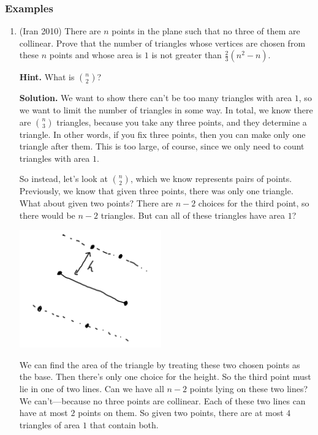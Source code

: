 \documentclass[11pt,paper=letter]{scrartcl}
\begin{document}
\subsubsection*{Examples}

\begin{enumerate}

\item (Iran 2010) There are $n$ points in the plane such that no three of them are collinear. Prove that the number of triangles whose vertices are chosen from these $n$ points and whose area is $1$ is not greater than $\frac{2}{3}(n^2 - n)$.

\textbf{Hint.} What is $\binom{n}{2}$?

\textbf{Solution.} We want to show there can't be too many triangles with area $1$, so we want to limit the number of triangles in some way. In total, we know there are $\binom{n}{3}$ triangles, because you take any three points, and they determine a triangle. In other words, if you fix three points, then you can make only one triangle after them. This is too large, of course, since we only need to count triangles with area $1$.

So instead, let's look at $\binom{n}{2}$, which we know represents pairs of points. Previously, we know that given three points, there was only one triangle. What about given two points? There are $n - 2$ choices for the third point, so there would be $n - 2$ triangles. But can all of these triangles have area $1$?

\begin{center}
  \includegraphics[height=2in]{198.jpg}
\end{center}

We can find the area of the triangle by treating these two chosen points as the base. Then there's only one choice for the height. So the third point must lie in one of two lines. Can we have all $n - 2$ points lying on these two lines? We can't---because no three points are collinear. Each of these two lines can have at most $2$ points on them. So given two points, there are at most $4$ triangles of area $1$ that contain both.


\end{enumerate}
\end{document}
